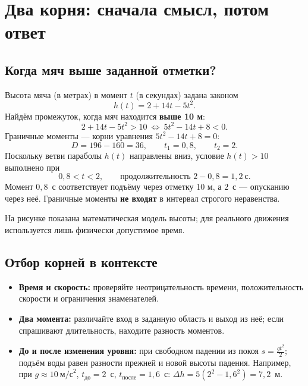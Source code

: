 \documentclass[a4paper,12pt]{article}
\newcommand{\key}[1]{\textbf{\color{darkaccent}#1}}
\newcommand{\fine}[1]{{\small\color{muted}#1}}
\begin{document}
\section{Два корня: сначала смысл, потом ответ}
\subsection{Когда мяч выше заданной отметки?}
Высота мяча (в метрах) в момент $t$ (в секундах) задана законом
\[
h(t)=2+14t-5t^2.
\]
Найдём промежуток, когда мяч находится \key{выше 10 м}:
\[
2+14t-5t^2>10\ \Longleftrightarrow\ 5t^2-14t+8<0.
\]
Граничные моменты — корни уравнения $5t^2-14t+8=0$:
\[
D=196-160=36,\qquad t_1=0{,}8,\qquad t_2=2.
\]
Поскольку ветви параболы $h(t)$ направлены вниз, условие $h(t)>10$ выполнено при
\[
\boxed{0{,}8<t<2},\qquad\text{продолжительность }\boxed{2-0{,}8=1{,}2\ \text{с}}.
\]
Момент $0{,}8$~с соответствует подъёму через отметку 10 м, а $2$~с — опусканию через неё. Граничные моменты \key{не входят} в интервал строгого неравенства.

\begin{center}
\end{center}
\fine{На рисунке показана математическая модель высоты; для реального движения используется лишь физически допустимое время.}

\subsection{Отбор корней в контексте}
\begin{itemize}[leftmargin=*,itemsep=2pt,topsep=3pt]
 \item \key{Время и скорость:} проверяйте неотрицательность времени, положительность скорости и ограничения знаменателей.
 \item \key{Два момента:} различайте вход в заданную область и выход из неё; если спрашивают длительность, находите разность моментов.
 \item \key{До и после изменения уровня:} при свободном падении из покоя $s=\frac{gt^2}{2}$; подъём воды равен разности прежней и новой высоты падения. Например, при $g\approx10\ \text{м/с}^2$, $t_{\text{до}}=2$~с, $t_{\text{после}}=1{,}6$~с: $\Delta h=5(2^2-1{,}6^2)=7{,}2$~м.
\end{itemize}
\end{document}
